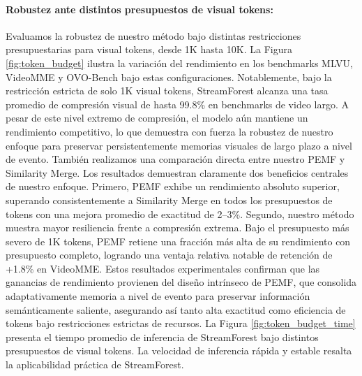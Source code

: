 \paragraph{Robustez ante distintos presupuestos de visual tokens:}
Evaluamos la robustez de nuestro método bajo distintas restricciones presupuestarias para visual tokens, desde 1K hasta 10K. La Figura \ref{fig:token_budget} ilustra la variación del rendimiento en los benchmarks MLVU, VideoMME y OVO-Bench bajo estas configuraciones. Notablemente, bajo la restricción estricta de solo 1K visual tokens, StreamForest alcanza una tasa promedio de compresión visual de hasta 99.8\% en benchmarks de video largo. A pesar de este nivel extremo de compresión, el modelo aún mantiene un rendimiento competitivo, lo que demuestra con fuerza la robustez de nuestro enfoque para preservar persistentemente memorias visuales de largo plazo a nivel de evento.
%
También realizamos una comparación directa entre nuestro PEMF y Similarity Merge. Los resultados demuestran claramente dos beneficios centrales de nuestro enfoque. Primero, PEMF exhibe un rendimiento absoluto superior, superando consistentemente a Similarity Merge en todos los presupuestos de tokens con una mejora promedio de exactitud de 2--3\%. Segundo, nuestro método muestra mayor resiliencia frente a compresión extrema. Bajo el presupuesto más severo de 1K tokens, PEMF retiene una fracción más alta de su rendimiento con presupuesto completo, logrando una ventaja relativa notable de retención de +1.8\% en VideoMME. Estos resultados experimentales confirman que las ganancias de rendimiento provienen del diseño intrínseco de PEMF, que consolida adaptativamente memoria a nivel de evento para preservar información semánticamente saliente, asegurando así tanto alta exactitud como eficiencia de tokens bajo restricciones estrictas de recursos.
%
La Figura \ref{fig:token_budget_time} presenta el tiempo promedio de inferencia de StreamForest bajo distintos presupuestos de visual tokens. La velocidad de inferencia rápida y estable resalta la aplicabilidad práctica de StreamForest.






